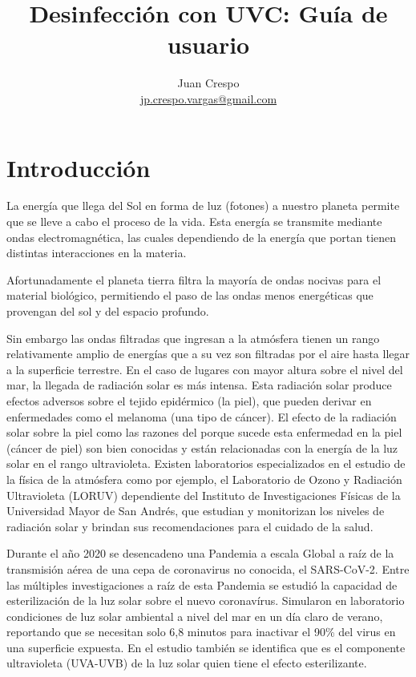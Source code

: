 \documentclass[letterpaper,11pt]{article}
\title{Desinfección con UVC: Guía de usuario}
\author{Juan Crespo  \\  \url{jp.crespo.vargas@gmail.com}}
\date{} %
\begin{document}
\maketitle


\begin{abstract}
  
\end{abstract}
  
\section{Introducción}
\label{sec:intro}
La energía que llega del Sol en forma de luz (fotones) a nuestro planeta permite que se lleve a cabo el proceso de la vida. Esta energía se transmite mediante ondas electromagnética, las cuales dependiendo de la energía que portan tienen distintas interacciones en la materia. 

Afortunadamente el planeta tierra filtra la mayoría de ondas nocivas para el material biológico, permitiendo el paso de las ondas menos energéticas que provengan del sol y del espacio profundo.

Sin embargo las ondas filtradas que ingresan a la atmósfera tienen un rango relativamente amplio de energías que a su vez son filtradas por el aire hasta llegar a la superficie terrestre. En el caso de lugares con mayor altura sobre el nivel del mar, la llegada de radiación solar es más intensa. Esta radiación solar produce efectos adversos sobre el tejido epidérmico (la piel), que pueden derivar en enfermedades como el melanoma (una tipo de cáncer). El efecto de la radiación solar sobre la piel como las razones del porque sucede esta enfermedad en la piel (cáncer de piel) son bien conocidas y están relacionadas con la energía de la luz solar en el rango ultravioleta. Existen laboratorios especializados en el estudio de la física de la atmósfera como por ejemplo, el Laboratorio de Ozono y Radiación Ultravioleta (LORUV) dependiente del Instituto de Investigaciones Físicas de la Universidad Mayor de San Andrés, que estudian y monitorizan los niveles de radiación solar y brindan sus recomendaciones para el cuidado de la salud. 

Durante el año 2020 se desencadeno una Pandemia a escala Global a raíz de la transmisión aérea de una cepa de coronavirus no conocida, el SARS-CoV-2. Entre las múltiples investigaciones a raíz de esta Pandemia se estudió la capacidad de esterilización de la luz solar \cite{covidsol} sobre el nuevo coronavírus. Simularon en laboratorio condiciones de luz solar ambiental a nivel del mar en un día claro de verano, reportando que se necesitan solo 6,8 minutos para inactivar el 90\% del virus en una superficie expuesta. En el estudio también se identifica que es el componente ultravioleta (UVA-UVB) de la luz solar quien tiene el efecto esterilizante. 
\end{document}
